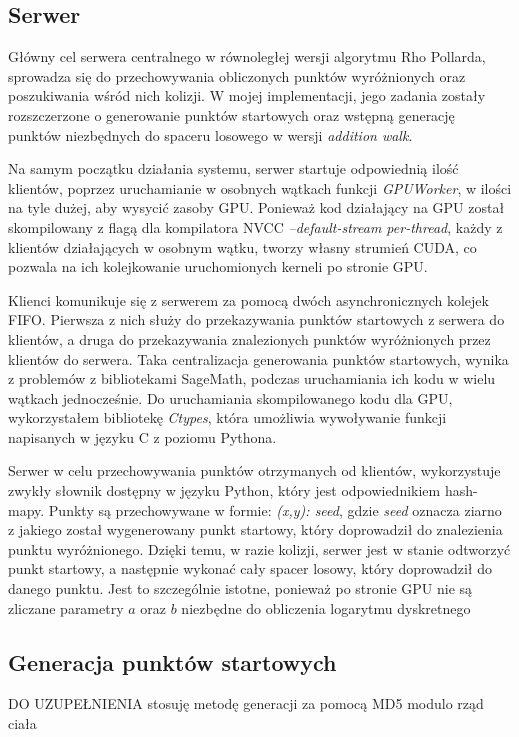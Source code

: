 \subsection{Serwer}
Główny cel serwera centralnego w równoległej wersji algorytmu Rho Pollarda, sprowadza się do
przechowywania obliczonych punktów wyróżnionych oraz poszukiwania wśród nich kolizji.
W mojej implementacji, jego zadania zostały rozszczerzone o generowanie punktów startowych
oraz wstępną generację punktów niezbędnych do spaceru losowego w wersji \textit{addition walk}.
\par
Na samym początku działania systemu, serwer startuje odpowiednią ilość
klientów, poprzez uruchamianie w osobnych wątkach funkcji \textit{GPUWorker},
w ilości na tyle dużej, aby wysycić zasoby GPU.
Ponieważ kod działający na GPU został skompilowany z flagą dla kompilatora NVCC \textit{--default-stream per-thread},
każdy z klientów działających w osobnym wątku, tworzy własny strumień CUDA, co pozwala na ich kolejkowanie uruchomionych kerneli po stronie GPU.
\par
Klienci komunikuje się z serwerem za pomocą dwóch asynchronicznych kolejek FIFO.
Pierwsza z nich służy do przekazywania punktów startowych z serwera do klientów, a druga do przekazywania
znalezionych punktów wyróżnionych przez klientów do serwera. Taka centralizacja
generowania punktów startowych, wynika z problemów z bibliotekami SageMath,
podczas uruchamiania ich kodu w wielu wątkach jednocześnie.
Do uruchamiania skompilowanego kodu dla GPU, wykorzystałem
bibliotekę \textit{Ctypes}, która umożliwia wywoływanie funkcji napisanych w języku C z poziomu Pythona.
\par
Serwer w celu przechowywania punktów otrzymanych od klientów, wykorzystuje
zwykły słownik dostępny w języku Python, który jest odpowiednikiem hash-mapy.
Punkty są przechowywane w formie: \textit{(x,y): seed}, gdzie \textit{seed} oznacza
ziarno z jakiego został wygenerowany punkt startowy, który doprowadził do znalezienia punktu wyróżnionego.
Dzięki temu, w razie kolizji, serwer jest w stanie odtworzyć punkt startowy, a następnie wykonać cały spacer losowy, który doprowadził do danego punktu.
Jest to szczególnie istotne, ponieważ po stronie GPU nie są zliczane parametry $a$ oraz $b$ niezbędne do obliczenia
logarytmu dyskretnego
\subsection*{Generacja punktów startowych}
DO UZUPEŁNIENIA
stosuję metodę generacji za pomocą MD5 modulo rząd ciała

